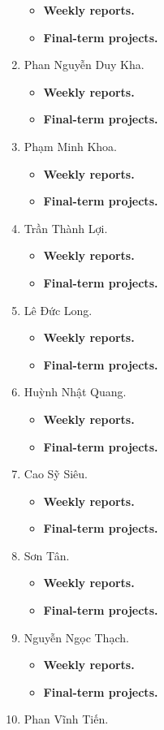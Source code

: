 \documentclass{article}
\begin{document}
\begin{enumerate}
    \begin{itemize}
        \item {\bf Weekly reports.}
        \item {\bf Final-term projects.}
    \end{itemize}
    \item {\sc Phan Nguyễn Duy Kha.}
    \begin{itemize}
        \item {\bf Weekly reports.}
        \item {\bf Final-term projects.}
    \end{itemize}
    \item {\sc Phạm Minh Khoa.}
    \begin{itemize}
        \item {\bf Weekly reports.}
        \item {\bf Final-term projects.}
    \end{itemize}
    \item {\sc Trần Thành Lợi.}
    \begin{itemize}
        \item {\bf Weekly reports.}
        \item {\bf Final-term projects.}
    \end{itemize}
    \item {\sc Lê Đức Long.}
    \begin{itemize}
        \item {\bf Weekly reports.}
        \item {\bf Final-term projects.}
    \end{itemize}
    \item {\sc Huỳnh Nhật Quang.}
    \begin{itemize}
        \item {\bf Weekly reports.}
        \item {\bf Final-term projects.}
    \end{itemize}
    \item {\sc Cao Sỹ Siêu.}
    \begin{itemize}
        \item {\bf Weekly reports.}
        \item {\bf Final-term projects.}
    \end{itemize}
    \item {\sc Sơn Tân.}
    \begin{itemize}
        \item {\bf Weekly reports.}
        \item {\bf Final-term projects.}
    \end{itemize}
    \item {\sc Nguyễn Ngọc Thạch.}
    \begin{itemize}
        \item {\bf Weekly reports.}
        \item {\bf Final-term projects.}
    \end{itemize}
    \item {\sc Phan Vĩnh Tiến.}
\end{enumerate}
\end{document}
